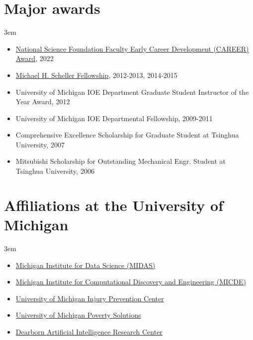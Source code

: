\documentclass[11pt]{article}
\newenvironment{main}
{\begin{adjustwidth}{3em}{}}
{\end{adjustwidth}}
\begin{document}
\section*{Major awards}
\begin{main}

\begin{itemize}
    \item \href{https://www.nsf.gov/awardsearch/showAward?AWD_ID=2142757}{National Science Foundation Faculty Early Career Development (CAREER) Award}, 2022
    \item \href{https://scholarships.engin.umich.edu/featured/michael-h-scheller-fund/}{Michael H. Scheller Fellowship}, 2012-2013, 2014-2015
    \item University of Michigan IOE Department Graduate Student Instructor of the Year Award, 2012
    \item University of Michigan IOE Departmental Fellowship, 2009-2011
    \item Comprehensive Excellence Scholarship for Graduate Student at Tsinghua University, 2007
    \item Mitsubishi Scholarship for Outstanding Mechanical Engr. Student at Tsinghua University, 2006
\end{itemize}


\end{main}
\section*{Affiliations at the University of Michigan}
\begin{main}

\begin{itemize}
    \item \href{https://midas.umich.edu/}{Michigan Institute for Data Science (MIDAS)}
    \item \href{https://micde.umich.edu/}{Michigan Institute for Computational Discovery and Engineering (MICDE)}
    \item \href{https://injurycenter.umich.edu/}{University of Michigan Injury Prevention Center}
    \item \href{https://poverty.umich.edu/}{University of Michigan Poverty Solutions}
    \item \href{https://umdearborn.edu/cecs/research/centers/dearborn-artificial-intelligence-research-dair-center}{Dearborn Artificial Intelligence Research Center}
\end{itemize}


\end{main}
\end{document}
